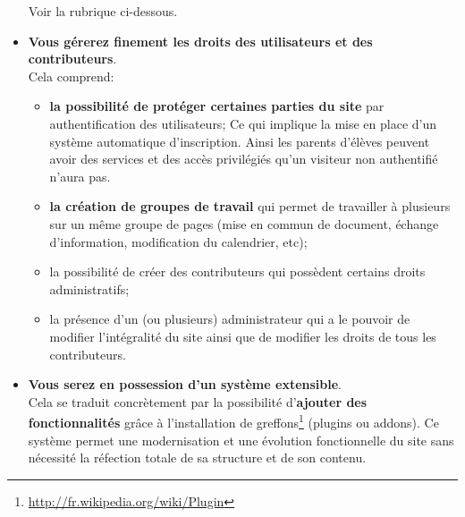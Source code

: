 \documentclass[]{extarticle}
\begin{document}
\begin{itemize}
  Voir la rubrique ci-dessous.
\item \textbf{Vous gérerez finement les droits des utilisateurs et des
    contributeurs}.\\
  Cela comprend:
  \begin{itemize}
  \item \textbf{la possibilité de protéger certaines parties du site} par
    authentification des utilisateurs; Ce qui implique la mise en place d'un
    système automatique d'inscription. Ainsi les parents d'élèves
    peuvent avoir des services et des accès privilégiés qu'un visiteur
    non authentifié n'aura pas.
  \item \textbf{la création de groupes de travail} qui permet de travailler à
    plusieurs sur un même groupe de pages (mise en commun de document,
    échange d'information, modification du calendrier, etc);
  \item la possibilité de créer des contributeurs qui possèdent
    certains droits administratifs;
  \item la présence d'un (ou plusieurs) administrateur qui a le pouvoir de
    modifier l'intégralité du site ainsi que de  modifier les droits
    de tous les contributeurs.
  \end{itemize}
\item \textbf{Vous serez en possession d'un système extensible}.\\
  Cela se traduit concrètement par la possibilité d'\textbf{ajouter des
    fonctionnalités} grâce à l'installation de
  greffons\footnote{\url{http://fr.wikipedia.org/wiki/Plugin}}
  (plugins ou addons). Ce système permet une modernisation et
  une évolution fonctionnelle du site sans nécessité la réfection
  totale de sa structure et de son contenu.

\end{itemize}

\end{document}
